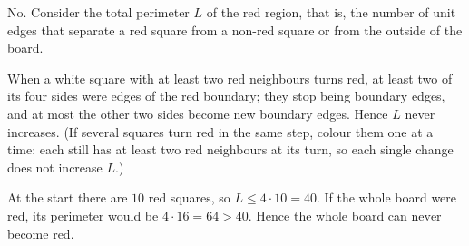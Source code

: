 No. Consider the total perimeter $L$ of the red region, that is, the number of unit edges that separate a red square from a non-red square or from the outside of the board.

When a white square with at least two red neighbours turns red, at least two of its four sides were edges of the red boundary; they stop being boundary edges, and at most the other two sides become new boundary edges. Hence $L$ never increases. (If several squares turn red in the same step, colour them one at a time: each still has at least two red neighbours at its turn, so each single change does not increase $L$.)

At the start there are $10$ red squares, so $L\le 4\cdot10=40$. If the whole board were red, its perimeter would be $4\cdot16=64>40$. Hence the whole board can $\boxed{\text{never}}$ become red.
